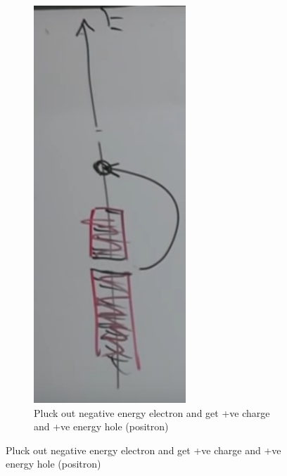 \documentclass[]{article}
\begin{document}
\begin{figure}[H]
\begin{center}
\begin{subfigure}[t]{0.3\textwidth}
\begin{center}
			\end{center}
		\end{subfigure}
		\begin{subfigure}[t]{0.3\textwidth}
			\begin{center}
				\caption{Pluck out negative energy electron and get +ve charge and +ve energy hole (positron)}\label{fig:dirac:sea}
				\includegraphics[width=\textwidth]{DiracSea}

\end{center}
\end{subfigure}
\end{center}
\end{figure}
\end{document}

